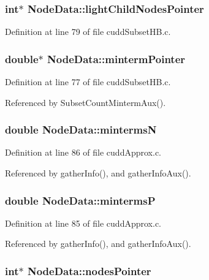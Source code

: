 \subsubsection{\setlength{\rightskip}{0pt plus 5cm}int$\ast$ \bf{Node\-Data::light\-Child\-Nodes\-Pointer}}\label{structNodeData_a681959753a1283ca4c6098c507c0c34}




Definition at line 79 of file cudd\-Subset\-HB.c.
\subsubsection{\setlength{\rightskip}{0pt plus 5cm}double$\ast$ \bf{Node\-Data::minterm\-Pointer}}\label{structNodeData_e01e003cf5168535a9e198f2c45ed766}




Definition at line 77 of file cudd\-Subset\-HB.c.

Referenced by Subset\-Count\-Minterm\-Aux().
\subsubsection{\setlength{\rightskip}{0pt plus 5cm}double \bf{Node\-Data::minterms\-N}}\label{structNodeData_186542cb42edf756b8e15406a02337c1}




Definition at line 86 of file cudd\-Approx.c.

Referenced by gather\-Info(), and gather\-Info\-Aux().
\subsubsection{\setlength{\rightskip}{0pt plus 5cm}double \bf{Node\-Data::minterms\-P}}\label{structNodeData_1889af4d17eecaa7cdb5585282759b2b}




Definition at line 85 of file cudd\-Approx.c.

Referenced by gather\-Info(), and gather\-Info\-Aux().
\subsubsection{\setlength{\rightskip}{0pt plus 5cm}int$\ast$ \bf{Node\-Data::nodes\-Pointer}}\label{structNodeData_3d35dddf049fd01105871bf6e235fcbe}




